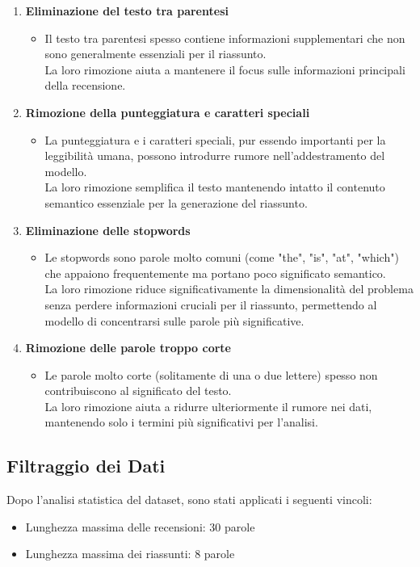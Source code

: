 \documentclass[a4paper, 12pt]{article}
\begin{document}
\begin{enumerate}
    \item \textbf{Eliminazione del testo tra parentesi}
    \begin{itemize}
        \item Il testo tra parentesi spesso contiene informazioni supplementari che non sono generalmente essenziali per il riassunto.\\ 
        La loro rimozione aiuta a mantenere il focus sulle informazioni principali della recensione.
    \end{itemize}

    \item \textbf{Rimozione della punteggiatura e caratteri speciali}
    \begin{itemize}
        \item La punteggiatura e i caratteri speciali, pur essendo importanti per la leggibilità umana, possono introdurre rumore nell'addestramento del modello.\\
        La loro rimozione semplifica il testo mantenendo intatto il contenuto semantico essenziale per la generazione del riassunto.
    \end{itemize}

    \item \textbf{Eliminazione delle stopwords}
    \begin{itemize}
        \item Le stopwords sono parole molto comuni (come "the", "is", "at", "which") che appaiono frequentemente ma portano poco significato semantico.\\
        La loro rimozione riduce significativamente la dimensionalità del problema senza perdere informazioni cruciali per il riassunto, permettendo al modello di concentrarsi sulle parole più significative.
    \end{itemize}

    \item \textbf{Rimozione delle parole troppo corte}
    \begin{itemize}
        \item Le parole molto corte (solitamente di una o due lettere) spesso non contribuiscono al significato del testo.\\
        La loro rimozione aiuta a ridurre ulteriormente il rumore nei dati, mantenendo solo i termini più significativi per l'analisi.
    \end{itemize}
\end{enumerate}

\subsection{Filtraggio dei Dati}
Dopo l'analisi statistica del dataset, sono stati applicati i seguenti vincoli:
\begin{itemize}
    \item Lunghezza massima delle recensioni: 30 parole
    \item Lunghezza massima dei riassunti: 8 parole
\end{itemize}
\end{document}
